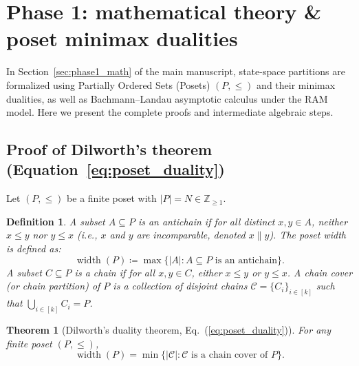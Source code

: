 \documentclass[11pt, letterpaper]{article}
\newtheorem{definition}{Definition}[section]
\newtheorem{theorem}{Theorem}[section]
\begin{document}
\section{Phase 1: mathematical theory \& poset minimax dualities}
In Section~\ref{sec:phase1_math} of the main manuscript, state-space partitions are formalized using Partially Ordered Sets (Posets) $(P, \le)$ and their minimax dualities, as well as Bachmann--Landau asymptotic calculus under the RAM model. Here we present the complete proofs and intermediate algebraic steps.

\subsection{Proof of Dilworth's theorem (\texorpdfstring{Equation~\ref{eq:poset_duality}}{Eq. 1})}
Let $(P, \le)$ be a finite poset with $|P| = N \in \mathbb{Z}_{\ge 1}$. 
\begin{definition}
A subset $A \subseteq P$ is an \emph{antichain} if for all distinct $x, y \in A$, neither $x \le y$ nor $y \le x$ (i.e., $x$ and $y$ are incomparable, denoted $x \parallel y$). The \emph{poset width} is defined as:
\begin{equation}
    \operatorname{width}(P) \coloneqq \max \{|A| : A \subseteq P \text{ is an antichain}\}.
\end{equation}
A subset $C \subseteq P$ is a \emph{chain} if for all $x, y \in C$, either $x \le y$ or $y \le x$. A \emph{chain cover} (or chain partition) of $P$ is a collection of disjoint chains $\mathcal{C} = \{C_i\}_{i \in [k]}$ such that $\bigcup_{i \in [k]} C_i = P$.
\end{definition}

\begin{theorem}[Dilworth's duality theorem, Eq.~(\ref{eq:poset_duality})]
For any finite poset $(P, \le)$,
\begin{equation}
    \operatorname{width}(P) = \min \{|\mathcal{C}| : \mathcal{C} \text{ is a chain cover of } P\}.
\end{equation}
\end{theorem}
\end{document}
